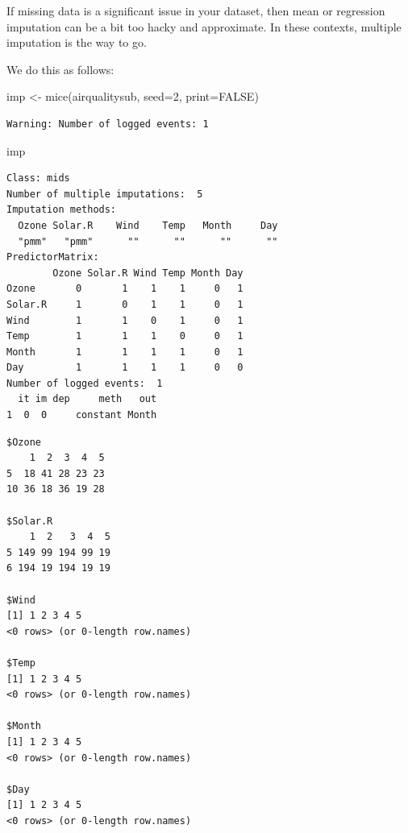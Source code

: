 \documentclass[
  letterpaper,
  DIV=11,
  numbers=noendperiod]{scrreprt}
\newenvironment{Shaded}{}{}
\newcommand{\AttributeTok}[1]{\textcolor[rgb]{0.49,0.56,0.16}{#1}}
\newcommand{\ConstantTok}[1]{\textcolor[rgb]{0.53,0.00,0.00}{#1}}
\newcommand{\DecValTok}[1]{\textcolor[rgb]{0.25,0.63,0.44}{#1}}
\newcommand{\FunctionTok}[1]{\textcolor[rgb]{0.02,0.16,0.49}{#1}}
\newcommand{\NormalTok}[1]{#1}
\newcommand{\OtherTok}[1]{\textcolor[rgb]{0.00,0.44,0.13}{#1}}
\newcommand{\SpecialCharTok}[1]{\textcolor[rgb]{0.25,0.44,0.63}{#1}}
\begin{document}
If missing data is a significant issue in your dataset, then mean or
regression imputation can be a bit too hacky and approximate. In these
contexts, multiple imputation is the way to go.

We do this as follows:

\begin{Shaded}
\begin{Highlighting}[]
\NormalTok{  imp }\OtherTok{\textless{}{-}} \FunctionTok{mice}\NormalTok{(airqualitysub, }\AttributeTok{seed=}\DecValTok{2}\NormalTok{, }\AttributeTok{print=}\ConstantTok{FALSE}\NormalTok{)}
\end{Highlighting}
\end{Shaded}

\begin{verbatim}
Warning: Number of logged events: 1
\end{verbatim}

\begin{Shaded}
\begin{Highlighting}[]
\NormalTok{  imp}
\end{Highlighting}
\end{Shaded}

\begin{verbatim}
Class: mids
Number of multiple imputations:  5 
Imputation methods:
  Ozone Solar.R    Wind    Temp   Month     Day 
  "pmm"   "pmm"      ""      ""      ""      "" 
PredictorMatrix:
        Ozone Solar.R Wind Temp Month Day
Ozone       0       1    1    1     0   1
Solar.R     1       0    1    1     0   1
Wind        1       1    0    1     0   1
Temp        1       1    1    0     0   1
Month       1       1    1    1     0   1
Day         1       1    1    1     0   0
Number of logged events:  1 
  it im dep     meth   out
1  0  0     constant Month
\end{verbatim}

\begin{Shaded}
\end{Shaded}

\begin{verbatim}
$Ozone
    1  2  3  4  5
5  18 41 28 23 23
10 36 18 36 19 28

$Solar.R
    1  2   3  4  5
5 149 99 194 99 19
6 194 19 194 19 19

$Wind
[1] 1 2 3 4 5
<0 rows> (or 0-length row.names)

$Temp
[1] 1 2 3 4 5
<0 rows> (or 0-length row.names)

$Month
[1] 1 2 3 4 5
<0 rows> (or 0-length row.names)

$Day
[1] 1 2 3 4 5
<0 rows> (or 0-length row.names)
\end{verbatim}
\end{document}
